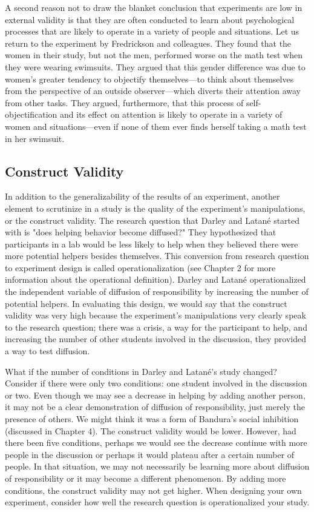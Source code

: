 A second reason not to draw the blanket conclusion that experiments are low in external validity is that they are often conducted to learn about psychological processes that are likely to operate in a variety of people and situations. Let us return to the experiment by Fredrickson and colleagues. They found that the women in their study, but not the men, performed worse on the math test when they were wearing swimsuits. They argued that this gender difference was due to women's greater tendency to objectify themselves---to think about themselves from the perspective of an outside observer---which diverts their attention away from other tasks. They argued, furthermore, that this process of self-objectification and its effect on attention is likely to operate in a variety of women and situations---even if none of them ever finds herself taking a math test in her swimsuit.
 
\subsection{Construct Validity}
 
In addition to the generalizability of the results of an experiment, another element to scrutinize in a study is the quality of the experiment's manipulations, or the construct validity. The research question that Darley and Latan\'e started with is "does helping behavior become diffused?" They hypothesized that participants in a lab would be less likely to help when they believed there were more potential helpers besides themselves. This conversion from research question to experiment design is called operationalization (see Chapter 2 for more information about the operational definition). Darley and Latan\'e operationalized the independent variable of diffusion of responsibility by increasing the number of potential helpers. In evaluating this design, we would say that the construct validity was very high because the experiment's manipulations very clearly speak to the research question; there was a crisis, a way for the participant to help, and increasing the number of other students involved in the discussion, they provided a way to test diffusion.
 
What if the number of conditions in Darley and Latan\'e's study changed? Consider if there were only two conditions: one student involved in the discussion or two. Even though we may see a decrease in helping by adding another person, it may not be a clear demonstration of diffusion of responsibility, just merely the presence of others. We might think it was a form of Bandura's social inhibition (discussed in Chapter 4). The construct validity would be lower. However, had there been five conditions, perhaps we would see the decrease continue with more people in the discussion or perhaps it would plateau after a certain number of people. In that situation, we may not necessarily be learning more about diffusion of responsibility or it may become a different phenomenon. By adding more conditions, the construct validity may not get higher. When designing your own experiment, consider how well the research question is operationalized your study.
 
